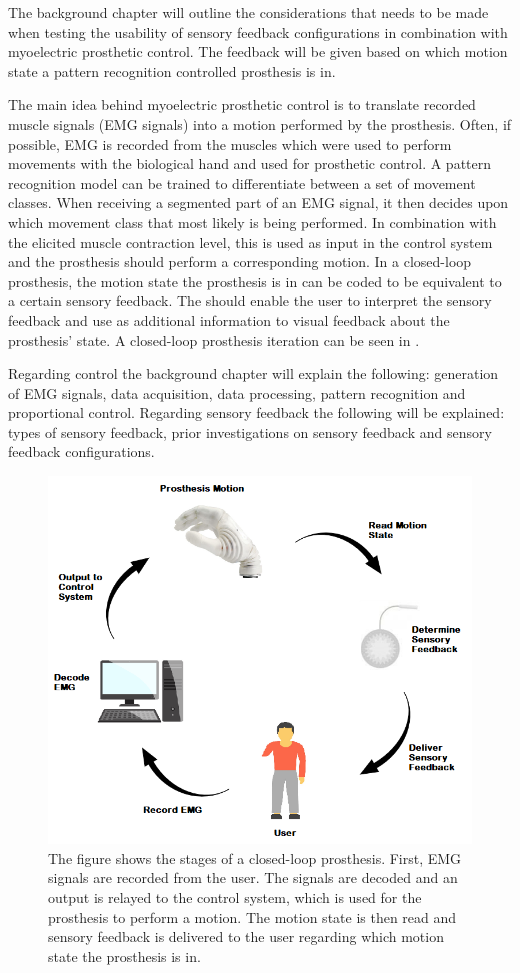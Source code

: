 The background chapter will outline the considerations that needs to be made when testing the usability of sensory feedback configurations in combination with myoelectric prosthetic control. The feedback will be given based on which motion state a pattern recognition controlled prosthesis is in. 

The main idea behind myoelectric prosthetic control is to translate recorded muscle signals (EMG signals) into a motion performed by the prosthesis. Often, if possible, EMG is recorded from the muscles which were used to perform movements with the biological hand and used for prosthetic control. A pattern recognition model can be trained to differentiate between a set of movement classes. When receiving a segmented part of an EMG signal, it then decides upon which movement class that most likely is being performed. In combination with the elicited muscle contraction level, this is used as input in the control system and the prosthesis should perform a corresponding motion. \cite{Guanglin2010} In a closed-loop prosthesis, the motion state the prosthesis is in can be coded to be equivalent to a certain sensory feedback. The should enable the user to interpret the sensory feedback and use as additional information to visual feedback about the prosthesis' state. \cite{Strbac2016} A closed-loop prosthesis iteration can be seen in . 

Regarding control the background chapter will explain the following: generation of EMG signals, data acquisition, data processing, pattern recognition and proportional control. Regarding sensory feedback the following will be explained: types of sensory feedback, prior investigations on sensory feedback and sensory feedback configurations. 

\begin{figure}[H]                 
	\includegraphics[width=.65\textwidth]{figures/closed_loop_pros}  
	\caption{The figure shows the stages of a closed-loop prosthesis. First, EMG signals are recorded from the user. The signals are decoded and an output is relayed to the control system, which is used for the prosthesis to perform a motion. The motion state is then read and sensory feedback is delivered to the user regarding which motion state the prosthesis is in.}
	\label{fig:closed_loop_pros} 
\end{figure}
